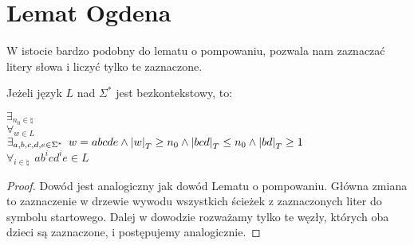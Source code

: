 \section{Lemat Ogdena}

W istocie bardzo podobny do lematu o pompowaniu, pozwala nam zaznaczać litery słowa i liczyć tylko te zaznaczone.

\begin{theorem}
	Jeżeli język \(L\) nad \(\Sigma^*\) jest bezkontekstowy, to:

	\( \exists_{n_0 \in \natural} \) \\
	\( \forall_{w \in L} \) \\
	\( \exists_{a, b, c, d, e \in \Sigma^*} \hspace{5pt} w = abcde \land \card{w}_T \geq n_0 \land \card{bcd}_T \leq n_0 \land \card{bd}_T \geq 1 \) \\
	\( \forall_{i \in \natural} \hspace{5pt} ab^{i}cd^{i}e \in L\)
\end{theorem}
\begin{proof}
	Dowód jest analogiczny jak dowód Lematu o pompowaniu. Główna zmiana to zaznaczenie w drzewie wywodu wszystkich ścieżek z zaznaczonych liter do symbolu startowego. Dalej w dowodzie rozważamy tylko te węzły, których oba dzieci są zaznaczone, i postępujemy analogicznie.
\end{proof}